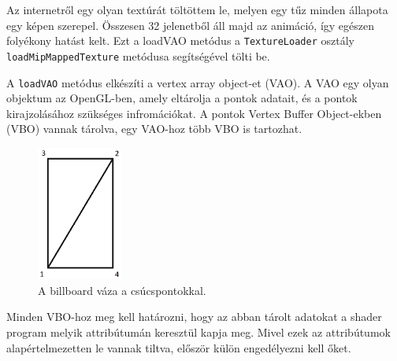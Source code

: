 Az internetről egy olyan textúrát töltöttem le, melyen egy tűz minden állapota egy képen szerepel. Összesen 32 jelenetből áll majd az animáció, így egészen folyékony hatást kelt. Ezt a loadVAO metódus a \texttt{TextureLoader} osztály \texttt{loadMipMappedTexture} metódusa segítségével tölti be. 

A \texttt{loadVAO} metódus elkészíti a vertex array object-et (VAO). A VAO egy olyan objektum az OpenGL-ben, amely eltárolja a pontok adatait, és a pontok kirajzolásához szükséges infromációkat. A pontok Vertex Buffer Object-ekben (VBO) vannak tárolva, egy VAO-hoz több VBO is tartozhat.

\begin{figure}
 \centering
 \includegraphics[width=0.25\textwidth]{kepek/billboardFrame.png}
 \caption{A billboard váza a csúcspontokkal.}
 \label{fig:spriteFrame}
\end{figure}

Minden VBO-hoz meg kell határozni, hogy az abban tárolt adatokat a shader program melyik attribútumán keresztül kapja meg. Mivel ezek az attribútumok alapértelmezetten le vannak tiltva, először külön engedélyezni kell őket. 

